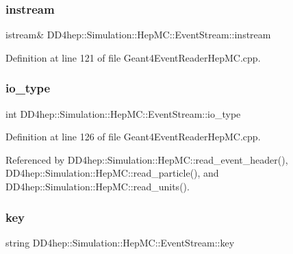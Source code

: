 \subsubsection{\texorpdfstring{instream}{instream}}
{\footnotesize\ttfamily istream\& D\+D4hep\+::\+Simulation\+::\+Hep\+M\+C\+::\+Event\+Stream\+::instream}



Definition at line 121 of file Geant4\+Event\+Reader\+Hep\+M\+C.\+cpp.

\hypertarget{class_d_d4hep_1_1_simulation_1_1_hep_m_c_1_1_event_stream_ab72b33619d738dd59539035f4e02792f}{}\label{class_d_d4hep_1_1_simulation_1_1_hep_m_c_1_1_event_stream_ab72b33619d738dd59539035f4e02792f} 
\subsubsection{\texorpdfstring{io\+\_\+type}{io\_type}}
{\footnotesize\ttfamily int D\+D4hep\+::\+Simulation\+::\+Hep\+M\+C\+::\+Event\+Stream\+::io\+\_\+type}



Definition at line 126 of file Geant4\+Event\+Reader\+Hep\+M\+C.\+cpp.



Referenced by D\+D4hep\+::\+Simulation\+::\+Hep\+M\+C\+::read\+\_\+event\+\_\+header(), D\+D4hep\+::\+Simulation\+::\+Hep\+M\+C\+::read\+\_\+particle(), and D\+D4hep\+::\+Simulation\+::\+Hep\+M\+C\+::read\+\_\+units().

\hypertarget{class_d_d4hep_1_1_simulation_1_1_hep_m_c_1_1_event_stream_ac17d00d243288f0b1dec90a167b57868}{}\label{class_d_d4hep_1_1_simulation_1_1_hep_m_c_1_1_event_stream_ac17d00d243288f0b1dec90a167b57868} 
\subsubsection{\texorpdfstring{key}{key}}
{\footnotesize\ttfamily string D\+D4hep\+::\+Simulation\+::\+Hep\+M\+C\+::\+Event\+Stream\+::key}



